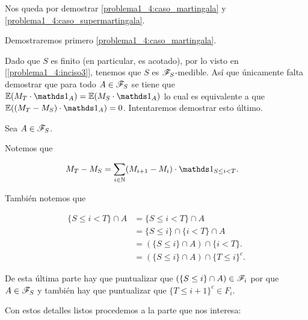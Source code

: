 	Nos queda por demostrar \eqref{problema1_4:caso_martingala} y \eqref{problema1_4:caso_supermartingala}.\par\null
	
	Demostraremos primero \eqref{problema1_4:caso_martingala}.\par\null
	
	 Dado que $S$ es finito (en particular, es acotado), por lo visto en [\ref{problema1_4:inciso3}], 
	 tenemos que $S$ es $\mathscr{F}_S$-medible. Así que únicamente falta demostrar que para todo $A \in \mathscr{F}_S$ se tiene que 
	 $\E(M_T \cdot \indic_A) = \E(M_S \cdot \indic_A)$ lo cual es equivalente a que $\E((M_T - M_S) \cdot \indic_A) = 0$.
	 Intentaremos demostrar esto último.\par\null
	 
	 Sea $A \in \mathscr{F}_S$.\par\null
	 
	 Notemos que	 
    
	 \begin{align}
	 	M_T - M_S &= \sum_{ i \in \N} ( M_{i+1} - M_i) \cdot \indic_{S \leq i < T }. 
	 \end{align}\par\null

	 También notemos que 
    
	 \begin{align}
	 	\{S \leq i < T \} \cap A 	&=		\{S \leq i < T \} \cap A 						\\
	 								&=		\{S \leq i \} \cap \{ i < T \} \cap A 			\\
	 								&=		(\{S \leq i \} \cap A) \cap \{ i < T \}.  		\\
	 								&=		(\{S \leq i \} \cap A) \cap \{ T \leq i \}^c.
	 \end{align}\par\null
    
     De esta última parte hay que puntualizar que $(\{S \leq i \} \cap A) \in \mathscr{F}_i$ por que $A \in \mathscr{F}_S$ y también
	 hay que puntualizar que $\{ T \leq i + 1 \}^c \in F_{i}$.\par\null
	 
	 Con estos detalles listos procedemos a la parte que nos interesa:
	 
